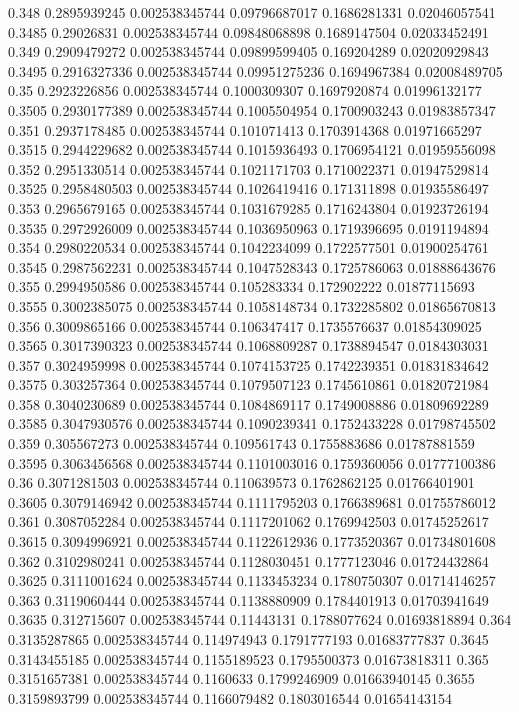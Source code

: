 {0.348 0.2895939245 0.002538345744 0.09796687017 0.1686281331 0.02046057541
0.3485 0.29026831 0.002538345744 0.09848068898 0.1689147504 0.02033452491
0.349 0.2909479272 0.002538345744 0.09899599405 0.169204289 0.02020929843
0.3495 0.2916327336 0.002538345744 0.09951275236 0.1694967384 0.02008489705
0.35 0.2923226856 0.002538345744 0.1000309307 0.1697920874 0.01996132177
0.3505 0.2930177389 0.002538345744 0.1005504954 0.1700903243 0.01983857347
0.351 0.2937178485 0.002538345744 0.101071413 0.1703914368 0.01971665297
0.3515 0.2944229682 0.002538345744 0.1015936493 0.1706954121 0.01959556098
0.352 0.2951330514 0.002538345744 0.1021171703 0.1710022371 0.01947529814
0.3525 0.2958480503 0.002538345744 0.1026419416 0.171311898 0.01935586497
0.353 0.2965679165 0.002538345744 0.1031679285 0.1716243804 0.01923726194
0.3535 0.2972926009 0.002538345744 0.1036950963 0.1719396695 0.0191194894
0.354 0.2980220534 0.002538345744 0.1042234099 0.1722577501 0.01900254761
0.3545 0.2987562231 0.002538345744 0.1047528343 0.1725786063 0.01888643676
0.355 0.2994950586 0.002538345744 0.105283334 0.172902222 0.01877115693
0.3555 0.3002385075 0.002538345744 0.1058148734 0.1732285802 0.01865670813
0.356 0.3009865166 0.002538345744 0.106347417 0.1735576637 0.01854309025
0.3565 0.3017390323 0.002538345744 0.1068809287 0.1738894547 0.0184303031
0.357 0.3024959998 0.002538345744 0.1074153725 0.1742239351 0.01831834642
0.3575 0.303257364 0.002538345744 0.1079507123 0.1745610861 0.01820721984
0.358 0.3040230689 0.002538345744 0.1084869117 0.1749008886 0.01809692289
0.3585 0.3047930576 0.002538345744 0.1090239341 0.1752433228 0.01798745502
0.359 0.305567273 0.002538345744 0.109561743 0.1755883686 0.01787881559
0.3595 0.3063456568 0.002538345744 0.1101003016 0.1759360056 0.01777100386
0.36 0.3071281503 0.002538345744 0.110639573 0.1762862125 0.01766401901
0.3605 0.3079146942 0.002538345744 0.1111795203 0.1766389681 0.01755786012
0.361 0.3087052284 0.002538345744 0.1117201062 0.1769942503 0.01745252617
0.3615 0.3094996921 0.002538345744 0.1122612936 0.1773520367 0.01734801608
0.362 0.3102980241 0.002538345744 0.1128030451 0.1777123046 0.01724432864
0.3625 0.3111001624 0.002538345744 0.1133453234 0.1780750307 0.01714146257
0.363 0.3119060444 0.002538345744 0.1138880909 0.1784401913 0.01703941649
0.3635 0.312715607 0.002538345744 0.11443131 0.1788077624 0.01693818894
0.364 0.3135287865 0.002538345744 0.114974943 0.1791777193 0.01683777837
0.3645 0.3143455185 0.002538345744 0.1155189523 0.1795500373 0.01673818311
0.365 0.3151657381 0.002538345744 0.1160633 0.1799246909 0.01663940145
0.3655 0.3159893799 0.002538345744 0.1166079482 0.1803016544 0.01654143154
}
